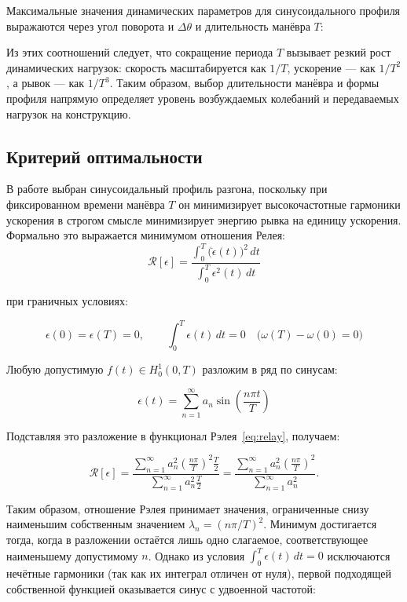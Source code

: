 Максимальные значения динамических параметров для синусоидального профиля выражаются через угол поворота и $\Delta \theta$ и длительность манёвра $T$:

Из этих соотношений следует, что сокращение периода $T$ вызывает резкий рост динамических нагрузок: скорость масштабируется как $1/T$, ускорение — как $1/T^2$, а рывок — как $1/T^3$. Таким образом, выбор длительности манёвра и формы профиля напрямую определяет уровень возбуждаемых колебаний и передаваемых нагрузок на конструкцию.

\subsection{Критерий оптимальности}

В работе выбран синусоидальный профиль разгона, поскольку при фиксированном времени манёвра $T$ он минимизирует высокочастотные гармоники ускорения в строгом смысле минимизирует энергию рывка на единицу ускорения. Формально это выражается минимумом отношения Релея:
\begin{equation}
	\label{eq:relay}
	\mathcal{R}[\epsilon] =
	\frac{\displaystyle \int_{0}^{T} \bigl(\dot{\epsilon}(t)\bigr)^{2}\,dt}
	{\displaystyle \int_{0}^{T} \epsilon^{2}(t)\,dt}
	\end{equation}

при граничных условиях:

\begin{equation}
	\epsilon(0) = \epsilon(T) = 0, \qquad
	\int_{0}^{T} \epsilon(t)\,dt = 0 \quad
	\bigl(\omega(T) - \omega(0) = 0\bigr)
\end{equation}

Любую допустимую $f(t) \in H_0^1(0,T)$ разложим в ряд по синусам:

\begin{equation}
	\epsilon(t) = \sum_{n=1}^{\infty} a_{n} \sin\!\left(\frac{n \pi t}{T}\right)
\end{equation}

Подставляя это разложение в функционал Рэлея~\cref{eq:relay}, получаем:

\begin{equation}
	\mathcal{R}[\epsilon] =
	\frac{\displaystyle \sum_{n=1}^{\infty} a_n^2 \left(\frac{n \pi}{T}\right)^2 \frac{T}{2}}
	{\displaystyle \sum_{n=1}^{\infty} a_n^2 \frac{T}{2}}
	=
	\frac{\sum_{n=1}^{\infty} a_n^2 \left(\frac{n \pi}{T}\right)^2}
	{\sum_{n=1}^{\infty} a_n^2}.
\end{equation}

Таким образом, отношение Рэлея принимает значения, ограниченные снизу наименьшим собственным значением $\lambda_n =(n\pi/T)^2$. Минимум достигается тогда, когда в разложении остаётся лишь одно слагаемое, соответствующее наименьшему допустимому $n$. Однако из условия $\int_{0}^{T} \epsilon(t)\,dt = 0$ исключаются нечётные гармоники (так как их интеграл отличен от нуля), первой подходящей собственной функцией оказывается синус с удвоенной частотой:

